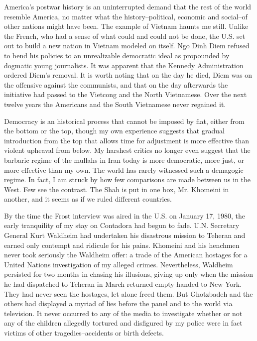 America’s postwar history is an uninterrupted demand that the rest of the world resemble America, no matter what the history--political, economic and social--of other nations might have been. The example of Vietnam haunts me still. Unlike the French, who had a sense of what could and could not be done, the U.S. set out to build a new nation in Vietnam modeled on itself. Ngo Dinh Diem refused to bend his policies to an unrealizable democratic ideal as propounded by dogmatic young journalists. It was apparent that the Kennedy Administration ordered Diem’s removal. It is worth noting that on the day he died, Diem was on the offensive against the communists, and that on the day afterwards the initiative had passed to the Vietcong and the North Vietnamese. Over the next twelve years the Americans and the South Vietnamese never regained it. 

Democracy is an historical process that cannot be imposed by fiat, either from the bottom or the top, though my own experience suggests that gradual introduction from the top that allows time for adjustment is more effective than violent upheaval from below. My harshest critics no longer even suggest that the barbaric regime of the mullahs in Iran today is more democratic, more just, or more effective than my own. The world has rarely witnessed such a demagogic regime. In fact, I am struck by how few comparisons are made between us in the West. Few see the contrast. The Shah is put in one box, Mr. Khomeini in another, and it seems as if we ruled different countries. 

By the time the Frost interview was aired in the U.S. on January 17, 1980, the early tranquility of my stay on Contadora had begun to fade. U.N. Secretary General Kurt Waldheim had undertaken his disastrous mission to Teheran and earned only contempt and ridicule for his pains. Khomeini and his henchmen never took seriously the Waldheim offer: a trade of the American hostages for a United Nations investigation of my alleged crimes. Nevertheless, Waldheim persisted for two months in chasing his illusions, giving up only when the mission he had dispatched to Teheran in March returned empty-handed to New York. They had never seen the hostages, let alone freed them. But Ghotzbadeh and the others had displayed a myriad of lies before the panel and to the world via television. It never occurred to any of the media to investigate whether or not any of the children allegedly tortured and disfigured by my police were in fact victims of other tragedies--accidents or birth defects. 

